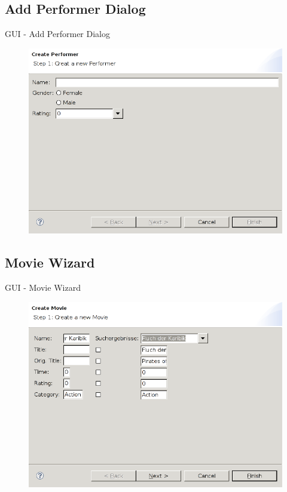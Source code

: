 \documentclass{beamer} %
\begin{document}
	\subsection{Add Performer Dialog}
	\begin{frame}{GUI - Add Performer Dialog}
		\begin{figure}[H]
			\centering
			\includegraphics[width=\linewidth]{add-performer-dialog.png}
		\end{figure}
	\end{frame}

	\subsection{Movie Wizard}
	\begin{frame}{GUI - Movie Wizard}
		\begin{figure}[H]
			\centering
			\includegraphics[width=\linewidth]{movie-wizard.png}
		\end{figure}
	\end{frame}
\end{document}
